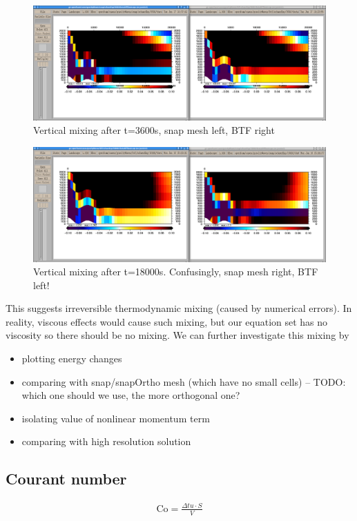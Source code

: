 \begin{figure}
\includegraphics[width=\textwidth]{interim-results/gravityWavesBTFsnapMidZoom3600.png}
\caption{Vertical mixing after t=3600s, snap mesh left, BTF right}
\label{fig:gw:mixing-3600s}
\end{figure}

\begin{figure}
\includegraphics[width=\textwidth]{interim-results/gravityWavesBTFsnapMidZoom18000.png}
\caption{Vertical mixing after t=18000s.  Confusingly, snap mesh right, BTF left!}
\label{fig:gw:mixing-18000s}
\end{figure}

This suggests irreversible thermodynamic mixing (caused by numerical errors).  In reality, viscous effects would cause such mixing, but our equation set has no viscosity so there should be no mixing.  We can further investigate this mixing by
\begin{itemize}
	\item plotting energy changes
	\item comparing with snap/snapOrtho mesh (which have no small cells) -- TODO: which one should we use, the more orthogonal one?
	\item isolating value of nonlinear momentum term
	\item comparing with high resolution solution
\end{itemize}

\subsection{Courant number}
\begin{align}
	\mathrm{Co} = \frac{\Delta t u \cdot S}{V}
\end{align}

